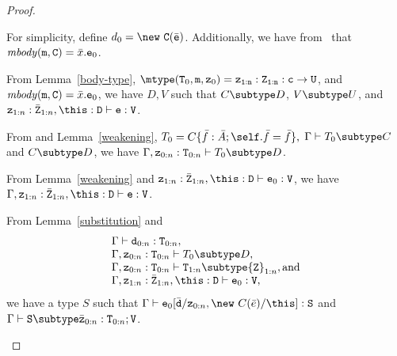 \begin{proof}
\begin{itemize}
\begin{itemize}
            For simplicity, define $d_0 = \new\ {\tt C}(\bar{\tt e})$.
            Additionally, we have from \RInvk\ that
            ${\mathit{mbody}({\tt m},{\tt C})=\bar{x}. {\tt e}_0}$.

            From Lemma~\ref{body-type}, 
            $\mtype({\tt T}_0,{\tt m},{\tt z}_0) =
               \tt {\tt z}_{1:n}: {\tt Z}_{1:n}:c \rightarrow {\tt U}$, and
            ${\mathit{mbody}({\tt m},{\tt C})=\bar{x}. {\tt e}_0}$,
            we have $D,V$ such that $C \subtype D$, $V \subtype U$, and
            ${\tt z}_{1:n}: \bar{\tt Z}_{1:n},\this: {\tt D} \vdash 
                  {\tt e}: {\tt V}$.

            From  and Lemma~\ref{weakening},
            $T_0 = C\{\bar{f}: \bar{A}; \self.\bar{f} = \bar{f}\},$ 
            $\Gamma \vdash T_0 \subtype C$ and
            $C \subtype D$, 
            we have
            $\Gamma, {\tt z}_{0:n}: {\tt T}_{0:n} \vdash T_0 \subtype D$.

            From Lemma~\ref{weakening} and
            ${\tt z}_{1:n}: \bar{\tt Z}_{1:n},\this: {\tt D} \vdash 
                  {\tt e}_0: {\tt V}$, 
            we have
            $\Gamma, {\tt z}_{1:n}: \bar{\tt Z}_{1:n},\this: {\tt D} \vdash 
                  {\tt e}: {\tt V}$.

            From Lemma~\ref{substitution} and
            $$
            \begin{array}{l}
            \Gamma \vdash {\tt d}_{0:n} : {\tt T}_{0:n}, \\
            \Gamma,{\tt z}_{0:n}: {\tt T}_{0:n} \vdash T_0 \subtype D, \\
            \Gamma, {\tt z}_{0:n}: {\tt T}_{0:n} \vdash
                  {\tt T}_{1:n} \subtype {\tt Z}_{1:n}, \mbox{and}\\
            \Gamma, {\tt z}_{1:n}: \bar{\tt Z}_{1:n},\this: {\tt D} \vdash 
                    {\tt e}_0: {\tt V}, \\
            \end{array}$$
            we have a type $S$ such that 
            $\Gamma \vdash
                 {\tt e}_0[\bar{\tt d}/{\tt z}_{0:n},\new\ C(\bar{e})/\this]: {\tt S}$ 
            and
            $\Gamma \vdash {\tt S} \subtype \bar{\tt z}_{0:n}: {\tt T}_{0:n};{\tt V}$.


\end{itemize}
\end{itemize}
\end{proof}
